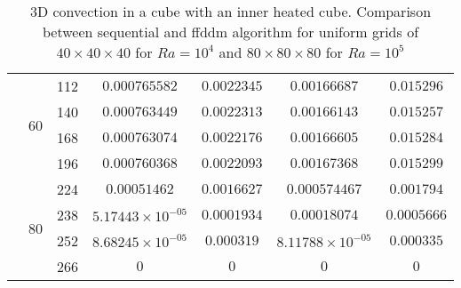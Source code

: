 \begin{table}[!h]
\begin{center}
\begin{tabular}{|*{7}{c|}}
			 & \multirow{4}{*}{60} & 112 & $0.000765582$ & $0.0022345$ & $ 0.00166687 $ & $0.015296$ \\%
			\cline{3-7}
			& & 140 & $0.000763449$ & $0.0022313$ & $ 0.00166143 $ & $0.015257$ \\ \cline{3-7} %
			& & 168 & $0.000763074$ & $0.0022176$ & $ 0.00166605 $ & $0.015284$  \\ \cline{3-7} %
			& & 196 & $0.000760368$ & $0.0022093$ & $ 0.00167368 $ & $0.015299$ \\ \cline{2-7} 
			 & \multirow{4}{*}{80} & 224 & $0.00051462$ & $0.0016627$ & $ 0.000574467 $ & $0.001794$ \\%
			\cline{3-7}
			& & 238 & $5.17443 \times 10^{-05}$ & $0.0001934$ & $ 0.00018074 $ & $0.0005666$ \\ \cline{3-7} %
			& & 252 & $8.68245 \times 10^{-05}$ & $0.000319$ & $ 8.11788 \times 10^{-05} $ & $0.000335$  \\ \cline{3-7} %
			& & 266 & $0$ & $0$ & $ 0 $ & $0$ \\ \hline 

		\end{tabular}
	\end{center}
	\caption {3D convection in a cube with an inner heated cube. Comparison between sequential and ffddm algorithm for uniform grids of $40 \times 40 \times 40$ for $Ra = 10^4$ and $80 \times 80 \times 80$ for $Ra = 10^5$}
	\label{tab-T2}
\end{table}

